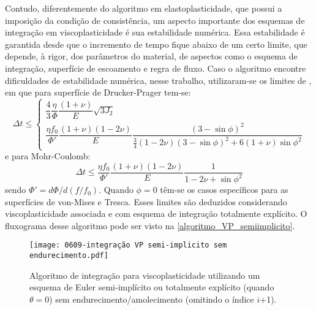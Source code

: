 Contudo, diferentemente do algoritmo em elastoplasticidade, que possui a imposição da condição de consistência, um aspecto importante dos esquemas de integração em viscoplasticidade é sua estabilidade numérica. Essa estabilidade é garantida desde que o incremento de tempo fique abaixo de um certo limite, que depende, à rigor, dos parâmetros do material, de aspectos como o esquema de integração, superfície de escoamento e regra de fluxo. Caso o algoritmo encontre dificuldades de estabilidade numérica, nesse trabalho, utilizaram-se os limites de , em que para superfície de Drucker-Prager tem-se:
\begin{equation}
	\label{eq:deltatmin_dp}
	\Delta t \leq \left\{ 
		\begin{array}{lcl} 
			\dfrac{4}{3}\dfrac{\eta}{\Phi}\dfrac{(1+\nu)}{E} {\sqrt{3J_2}} \\
			\dfrac{\eta f_0}{\Phi'}\dfrac{(1+\nu)(1-2\nu)}{E}\dfrac{(3-\sin{\phi})^2}{\frac{3}{4}(1-2\nu)(3-\sin{\phi})^2 + 6(1+\nu)\sin{\phi}^2}
		\end{array} \right.
\end{equation}
e para Mohr-Coulomb:
\begin{equation}
	\label{eq:deltatmin_mc}
	\Delta t \leq \dfrac{\eta f_0}{\Phi'}\dfrac{(1+\nu)(1-2\nu)}{E}\dfrac{1}{1-2\nu + \sin{\phi}^2}
\end{equation}
sendo $\Phi' = d\Phi / d(f/f_0)$. Quando $\phi = 0$ têm-se os casos específicos para as superfícies de von-Mises e Tresca. Esses limites são deduzidos considerando viscoplasticidade associada e com esquema de integração totalmente explícito. O fluxograma desse algoritmo pode ser visto na \autoref{algoritmo_VP_semiimplicito}.
\begin{figure}[H]
	\begin{center}
		\texttt{[image: 0609-integração VP semi-implicito sem endurecimento.pdf]}
	\end{center}
	\caption{\label{algoritmo_VP_semiimplicito}Algoritmo de integração para viscoplasticidade utilizando um esquema de Euler semi-implícito ou totalmente explícito (quando $\theta = 0$) sem endurecimento/amolecimento (omitindo o índice $i$+1).}
\end{figure}

